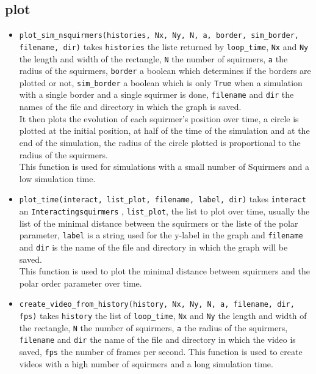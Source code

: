 \documentclass{article}
\begin{document}
\subsection{plot}
\begin{itemize}
   \item \texttt{plot\_sim\_nsquirmers(histories, Nx, Ny, N, a, border, sim\_border, filename, dir)} takes \texttt{histories}
   the liste returned by \texttt{loop\_time}, \texttt{Nx} and 
   \texttt{Ny} the length and width of the rectangle, \texttt{N} the number of squirmers, \texttt{a} the radius of the squirmers,
   \texttt{border} a boolean which determines if the borders are plotted or not, \texttt{sim\_border} a boolean which is only \texttt{True}
    when a simulation with a single border and a single squirmer is done, \texttt{filename} and \texttt{dir} the names 
    of the file and directory in which the graph is saved.\\
   It then plots the evolution of each squirmer's position over time, a circle is plotted at the initial position, at
   half of the time of the simulation and at the end of the simulation,
   the radius of the circle plotted is proportional to the radius of the squirmers.\\
   This function is used for simulations with a small number of Squirmers and a low simulation time.
   \item \texttt{plot\_time(interact, list\_plot, filename, label, dir)} takes \texttt{interact} an \texttt{Interactingsquirmers}
   , \texttt{list\_plot}, the list to plot over time, usually the list of the minimal distance between the squirmers or the liste of the polar parameter,
   \texttt{label} is a string used for the y-label in the graph and \texttt{filename} and \texttt{dir} is the name of the file
    and directory in which the graph will be saved.\\
    This function is used to plot the minimal distance between squirmers and the polar order parameter over time.
   \item \texttt{create\_video\_from\_history(history, Nx, Ny, N, a, filename, dir, fps)} takes \texttt{history}
   the list of \texttt{loop\_time}, \texttt{Nx} and \texttt{Ny} the length and width of the rectangle,
   \texttt{N} the number of squirmers, \texttt{a} the radius of the squirmers, \texttt{filename} and \texttt{dir}
   the name of the file and directory in which the video is saved, \texttt{fps} the number of frames per second.
    This function is used to create videos with a high number of squirmers and a long simulation time.
\end{itemize}
\end{document}
